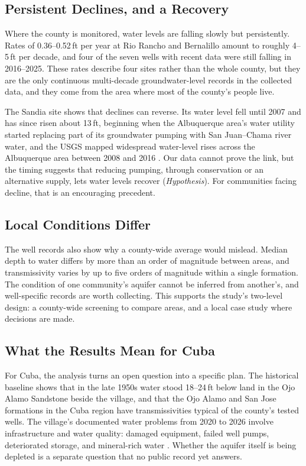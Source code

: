 \documentclass[10pt,twocolumn,letterpaper]{article}
\begin{document}
\subsection{Persistent Declines, and a Recovery}
Where the county is monitored, water levels are falling slowly but persistently. Rates of
0.36--0.52\,ft per year at Rio Rancho and Bernalillo amount to roughly 4--5\,ft per decade, and four
of the seven wells with recent data were still falling in 2016--2025. These rates describe four
sites rather than the whole county, but they are the only continuous multi-decade groundwater-level
records in the collected data, and they come from the area where most of the county's people live.

The Sandia site shows that declines can reverse. Its water level fell until 2007 and has since risen
about 13\,ft, beginning when the Albuquerque area's water utility started replacing part of its
groundwater pumping with San Juan--Chama river water, and the USGS mapped widespread water-level
rises across the Albuquerque area between 2008 and 2016 \citep{ritchie2019}. Our data cannot prove the link, but the timing suggests
that reducing pumping, through conservation or an alternative supply, lets water levels recover
(\emph{Hypothesis}). For communities facing decline, that is an encouraging precedent.

\subsection{Local Conditions Differ}
The well records also show why a county-wide average would mislead. Median depth to water differs by
more than an order of magnitude between areas, and transmissivity varies by up to five orders of
magnitude within a single formation. The condition of one community's aquifer cannot be inferred
from another's, and well-specific records are worth collecting. This supports the study's two-level
design: a county-wide screening to compare areas, and a local case study where decisions are made.

\subsection{What the Results Mean for Cuba}
For Cuba, the analysis turns an open question into a specific plan. The historical baseline shows
that in the late 1950s water stood 18--24\,ft below land in the Ojo Alamo Sandstone beside the
village, and that the Ojo Alamo and San Jose formations in the Cuba region have transmissivities
typical of the county's tested wells. The village's documented water problems from 2020 to 2026
involve infrastructure and water quality: damaged equipment, failed well pumps, deteriorated storage,
and mineral-rich water \citep{nmgov2022,hollinshead2021,usace2025,cuba2026a}. Whether the aquifer
itself is being depleted is a separate question that no public record yet answers.
\end{document}
